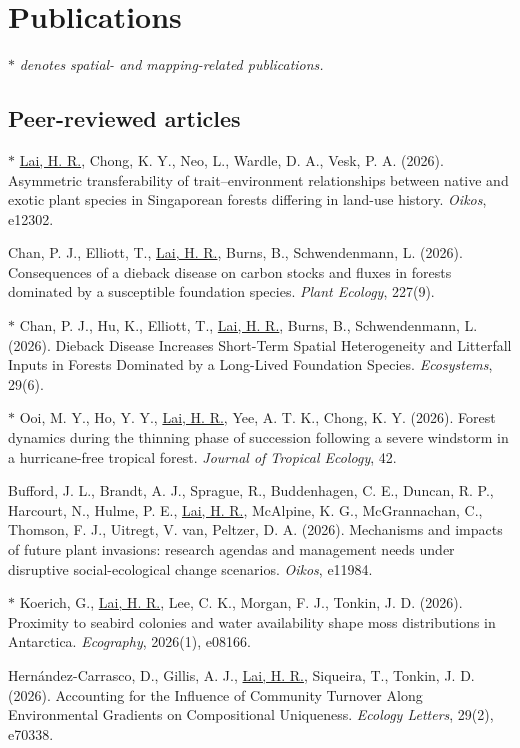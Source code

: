 \documentclass[a4paper]{article}
\begin{document}
\section*{Publications}
$\ast$ \textit{denotes spatial- and mapping-related publications.}

\subsection*{Peer-reviewed articles}

$\ast$ \hangindent=1cm \underline{Lai, H. R.}, Chong, K. Y., Neo, L., Wardle, D. A., Vesk, P. A. (2026). Asymmetric transferability of trait--environment relationships between native and exotic plant species in Singaporean forests differing in land-use history. \textit{Oikos}, e12302.

\hangindent=1cm Chan, P. J., Elliott, T., \underline{Lai, H. R.}, Burns, B., Schwendenmann, L. (2026). Consequences of a dieback disease on carbon stocks and fluxes in forests dominated by a susceptible foundation species. \textit{Plant Ecology}, 227(9).

$\ast$ \hangindent=1cm Chan, P. J., Hu, K., Elliott, T., \underline{Lai, H. R.}, Burns, B., Schwendenmann, L. (2026). Dieback Disease Increases Short-Term Spatial Heterogeneity and Litterfall Inputs in Forests Dominated by a Long-Lived Foundation Species. \textit{Ecosystems}, 29(6).

$\ast$ \hangindent=1cm Ooi, M. Y., Ho, Y. Y., \underline{Lai, H. R.}, Yee, A. T. K., Chong, K. Y. (2026). Forest dynamics during the thinning phase of succession following a severe windstorm in a hurricane-free tropical forest. \textit{Journal of Tropical Ecology}, 42.

\hangindent=1cm Bufford, J. L., Brandt, A. J., Sprague, R., Buddenhagen, C. E., Duncan, R. P., Harcourt, N., Hulme, P. E., \underline{Lai, H. R.}, McAlpine, K. G., McGrannachan, C., Thomson, F. J., Uitregt, V. van, Peltzer, D. A. (2026). Mechanisms and impacts of future plant invasions: research agendas and management needs under disruptive social-ecological change scenarios. \textit{Oikos}, e11984.

$\ast$ \hangindent=1cm Koerich, G., \underline{Lai, H. R.}, Lee, C. K., Morgan, F. J., Tonkin, J. D. (2026). Proximity to seabird colonies and water availability shape moss distributions in Antarctica. \textit{Ecography}, 2026(1), e08166.

\hangindent=1cm Hernández-Carrasco, D., Gillis, A. J., \underline{Lai, H. R.}, Siqueira, T., Tonkin, J. D. (2026). Accounting for the Influence of Community Turnover Along Environmental Gradients on Compositional Uniqueness. \textit{Ecology Letters}, 29(2), e70338.
\end{document}
